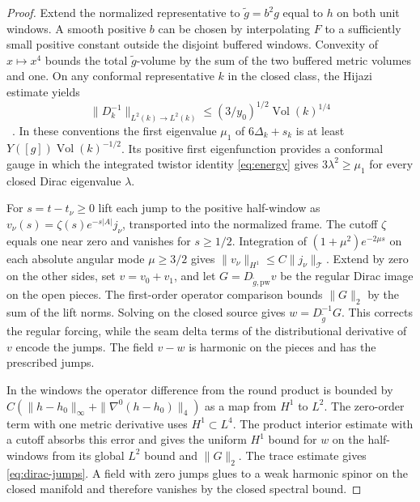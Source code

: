 \documentclass[11pt]{article}
\numberwithin{equation}{section}
\DeclareMathOperator{\Vol}{Vol}
\begin{document}
\begin{proof}
Extend the normalized representative to \(\widetilde g=b^2g\)
equal to \(h\) on both unit windows. A smooth positive \(b\) can be
chosen by interpolating \(F\) to a sufficiently small positive
constant outside the disjoint buffered windows. Convexity of
\(x\mapsto x^4\) bounds the total \(\widetilde g\)-volume by the sum
of the two buffered metric volumes and one. On any conformal
representative \(k\) in the closed class, the Hijazi estimate yields
\[
 \|D_k^{-1}\|_{L^2(k)\to L^2(k)}
 \le (3/y_0)^{1/2}\Vol(k)^{1/4}
\]
~\cite[Theorem A and (2.1)--(2.2)]{Hijazi1986Conformal}.
In these conventions the first eigenvalue \(\mu_1\) of
\(6\Delta_k+s_k\) is at least \(Y([g])\Vol(k)^{-1/2}\).
Its positive first eigenfunction provides a conformal gauge in
which the integrated twistor identity \eqref{eq:energy} gives
\(3\lambda^2\ge\mu_1\) for every closed Dirac eigenvalue \(\lambda\).

For \(s=t-t_\nu\ge0\) lift each jump to the positive half-window
as \(v_\nu(s)=\zeta(s)e^{-s|A|}j_\nu\), transported into the normalized
frame. The cutoff \(\zeta\) equals one near zero and vanishes for
\(s\ge1/2\). Integration of \((1+\mu^2)e^{-2\mu s}\) on each
absolute angular mode \(\mu\ge3/2\) gives
\(\|v_\nu\|_{H^1}\le C\|j_\nu\|_{\mathcal T}\). Extend by zero on
the other sides, set \(v=v_0+v_1\), and let \(G=D_{\widetilde
g,\mathrm{pw}}v\) be the regular Dirac image on the open pieces.
The first-order operator comparison bounds \(\|G\|_2\) by the
sum of the lift norms. Solving on the closed source gives
\(w=D_{\widetilde g}^{-1}G\). This corrects the regular forcing,
while the seam delta terms of the distributional derivative of
\(v\) encode the jumps. The field \(v-w\) is harmonic on the
pieces and has the prescribed jumps.

In the windows the operator difference from the round product is
bounded by \(C(\|h-h_0\|_\infty+\|\nabla^0(h-h_0)\|_4)\) as a map
from \(H^1\) to \(L^2\). The zero-order term with one metric
derivative uses \(H^1\subset L^4\). The product interior estimate
with a cutoff absorbs this error and gives the uniform \(H^1\)
bound for \(w\) on the half-windows from its global \(L^2\) bound
and \(\|G\|_2\). The trace estimate gives \eqref{eq:dirac-jumps}.
A field with zero jumps glues to a weak harmonic spinor on the
closed manifold and therefore vanishes by the closed spectral bound.


\end{proof}
\end{document}
